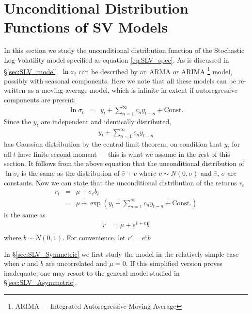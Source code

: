 \section{Unconditional Distribution Functions of SV Models}
\label{sec:XieCalc}
In this section we study the unconditional distribution function of
the Stochastic Log-Volatility model specified as equation
\ref{eq:SLV_spec}. As is discussed in \S\ref{sec:SLV_model},
$\ln\sigma_t$ can be described by an ARMA or ARIMA \footnote{ARIMA ---
  Integrated Autoregressive Moving Average} model, possibly with
seasonal components. Here we note that all these models can be
re-written as a moving average model, which is infinite in extent if
autoregressive components are present:
\begin{eqnarray*}
  \ln \sigma_t &=& y_t + \sum_{n=1}^\infty c_n y_{t-n} + \text{Const.}
\end{eqnarray*}
Since the $y_t$ are independent and identically distributed,
\begin{eqnarray*}
  y_t + \sum_{n=1}^\infty c_n y_{t-n}  
\end{eqnarray*}
has Gaussian distribution by the central limit theorem, on condition
that $y_t$ for all $t$ have finite second moment --- this is what we
assume in the rest of this section. It follows from the above equation
that the unconditional distribution of $\ln \sigma_t$ is the same as the
distribution of $\bar{v} + v$ where $v \sim N(0, \sigma)$ and
$\bar{v}$, $\sigma$ are constants. Now we can state that the
unconditional distribution of the returns $r_t$
\begin{eqnarray*}
  r_t &=& \mu + \sigma_t b_t\\
  &=& \mu + \exp\left(
    y_t + \sum_{n=1}^\infty c_n y_{t-n} + \text{Const.}
  \right)
\end{eqnarray*}
 is the same as
\begin{equation}  \label{eq:UnconditionalPdf}
  \begin{aligned}
    r &= \mu + e^{\bar{v} + v} b \\
  \end{aligned}
\end{equation}
where $b \sim N(0, 1)$. For convenience, let $r' = e^v b$

In \S\ref{sec:SLV_Symmetric} we first study the model in the
relatively simple case when $v$ and $b$ are uncorrelated and $\mu
= 0$. If this simplified version proves inadequate, one may resort to
the general model studied in \S\ref{sec:SLV_Asymmetric}.

